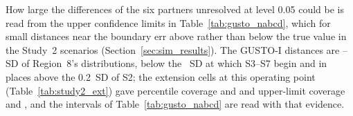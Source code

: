 \documentclass[AMA,Times1COL]{WileyNJDv5}
\begin{document}


How large the differences of the six partners unresolved at level 0.05 could be is read from the upper confidence limits in Table~\ref{tab:gusto_nabcd}, which for small distances near the boundary err above rather than below the true value in the Study~2 scenarios (Section~\ref{sec:sim_results}). The GUSTO-I distances are -- SD of Region~8's distributions, below the ~SD at which S3--S7 begin and in places above the 0.2~SD of S2; the extension cells at this operating point (Table~\ref{tab:study2_ext}) gave percentile coverage  and  and upper-limit coverage  and , and the intervals of Table~\ref{tab:gusto_nabcd} are read with that evidence.
\end{document}
